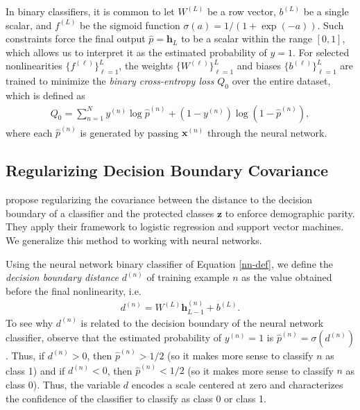 \documentclass{article}
\newcommand{\bd}[1]{\boldsymbol{#1}}
\newcommand{\hp}{\hat{p}}
\newcommand{\idx}[3][]{{#2}^{(#3)}_{#1}}
\newcommand{\bidx}[3][]{\bd{#2}^{(#3)}_{#1}}
\begin{document}
In binary classifiers, it is common to let $\idx W L$ be a row vector, $\idx b L$ be a single scalar, and $\idx f L$  be the sigmoid function $\sigma(a) = 1 / (1 + \exp (- a))$.  Such constraints force the final output $\hat{p} = \bd h_L$ to be a scalar within the range $[0, 1]$, which allows us to interpret it as the estimated probability of $y = 1$.  For selected nonlinearities $\{\idx f \ell\}_{\ell=1}^L$, the weights $\{\idx W \ell\}_{\ell=1}^L$ and biases $\{\idx b \ell\}_{\ell=1}^L$ are trained to minimize the \emph{binary cross-entropy loss} $Q_0$ over the entire dataset, which is defined as
\begin{align}
Q_0 = \sum_{n=1}^N \idx y n \log \idx \hp n + (1 - \idx y n) \log (1 - \idx \hp n), \label{bce}
\end{align}         
where each $\idx \hp n$ is generated by passing $\bidx x n$ through the neural network.

\subsection{Regularizing Decision Boundary Covariance} \label{method1}
\citet{zafar2015fairness} propose regularizing the covariance between the distance to the decision boundary of a classifier and the protected classes $\bd z$ to enforce demographic parity.  They apply their framework to logistic regression and support vector machines.  We generalize this method to working with neural networks.

Using the neural network binary classifier of Equation \ref{nn-def}, we define the \emph{decision boundary distance} $\idx d n$ of training example $n$ as the value obtained before the final nonlinearity, i.e. 
\begin{align}
\idx d n = \idx W {L} \bidx[L-1] h n + \idx b {L}. \label{decision-boundary-def}
\end{align} 
To see why $\idx d n$ is related to the decision boundary of the neural network classifier, observe that the estimated probability of $\idx y n = 1$ is $\idx \hp n = \sigma(\idx d n)$.  Thus, if $\idx d n > 0$, then $\idx \hp n > 1/2$ (so it makes more sense to classify $n$ as class 1) and if $\idx d n < 0$, then $\idx \hp n < 1/2$ (so it makes more sense to classify $n$ as class 0).  Thus, the variable $d$ encodes a scale centered at zero and characterizes the confidence of the classifier to classify as class 0 or class 1.  
\end{document}
